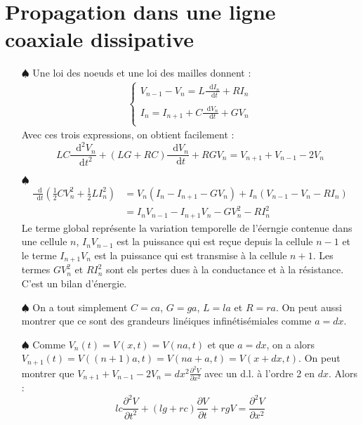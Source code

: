 \documentclass{report}
\newcommand*\dif{\mathop{}\!\mathrm{d}}
\begin{document}
\section*{Propagation dans une ligne coaxiale dissipative}

\begin{itemize}

	\item[$\spadesuit$] 	
	Une loi des noeuds et une loi des mailles donnent : 
	\begin{align*}
	\left\lbrace
	\begin{array}{ccc}
	V_{n-1}-V_{n}=L\frac{\dif I_{n}}{\dif t} + RI_n\\
	\\
	I_{n}=I_{n+1}+C\frac{\dif V_{n}}{\dif t}+GV_n\\
	\end{array}\right.
	\end{align*}		
	Avec ces trois expressions, on obtient facilement :
	\begin{equation}
		LC\frac{\dif^2 V_n}{\dif t^2} + (LG+RC)\frac{\dif V_{n}}{\dif t}+RGV_n=V_{n+1}+V_{n-1}-2V_n
		\label{eq:prop}
	\end{equation}
	
	 \item[$\spadesuit$] 
	 \begin{align*}
	 \frac{\dif}{\dif t}\left( \frac{1}{2}CV_n^2 +\frac{1}{2} LI_n^2 \right) &=V_n(I_{n}-I_{n+1}-GV_n)+ I_n(V_{n-1}-V_{n}-RI_n) \\
	 &=I_nV_{n-1}-I_{n+1}V_n-GV_n^2-RI_n^2
	 \end{align*}
	 Le terme global représente la variation temporelle de l'éerngie contenue dans une cellule $n$, $I_nV_{n-1}$ est la puissance qui est reçue depuis la cellule $n-1$ et le terme $I_{n+1}V_n$ est la puissance qui est transmise à la cellule $n+1$. Les termes $GV_n^2$ et $RI_n^2$ sont els pertes dues à la conductance et à la résistance. C'est un bilan d'énergie.

	\item[$\spadesuit$] On a tout simplement $C = ca$, $G=ga$, $L=la$ et $R=ra$. On peut aussi montrer que ce sont des grandeurs linéiques infinétisémiales comme $a=dx$.

	\item[$\spadesuit$] Comme $V_n(t)=V(x,t)=V(na,t)$ et que $a=dx$, on a alors $V_{n+1}(t)=V((n+1)a,t) = V(na+a,t)=V(x+dx,t)$.
	On peut montrer que $V_{n+1}+V_{n-1}-2V_n=dx^2\frac{\partial^2V}{\partial x^2}$ avec un d.l. à l'ordre 2 en $dx$. Alors :
	\begin{equation}
		lc\frac{\partial^2 V}{\partial t^2} + (lg+rc)\frac{\partial V}{\partial t}+rgV=\frac{\partial^2V}{\partial x^2}
		\label{eq:prop}
	\end{equation}


\end{itemize}
\end{document}

